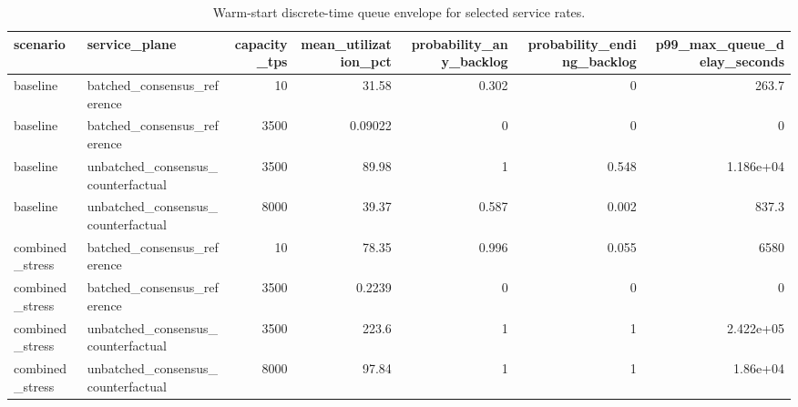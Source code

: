 \begin{table}[t]
\centering
\small
\caption{Warm-start discrete-time queue envelope for selected service rates.}
\label{tab:queue-envelope}
\begin{tabular}{llrrrrr}
\toprule
scenario & service\_plane & capacity\_tps & mean\_utilization\_pct & probability\_any\_backlog & probability\_ending\_backlog & p99\_max\_queue\_delay\_seconds \\
\midrule
baseline & batched\_consensus\_reference & 10 & 31.58 & 0.302 & 0 & 263.7 \\
baseline & batched\_consensus\_reference & 3500 & 0.09022 & 0 & 0 & 0 \\
baseline & unbatched\_consensus\_counterfactual & 3500 & 89.98 & 1 & 0.548 & 1.186e+04 \\
baseline & unbatched\_consensus\_counterfactual & 8000 & 39.37 & 0.587 & 0.002 & 837.3 \\
combined\_stress & batched\_consensus\_reference & 10 & 78.35 & 0.996 & 0.055 & 6580 \\
combined\_stress & batched\_consensus\_reference & 3500 & 0.2239 & 0 & 0 & 0 \\
combined\_stress & unbatched\_consensus\_counterfactual & 3500 & 223.6 & 1 & 1 & 2.422e+05 \\
combined\_stress & unbatched\_consensus\_counterfactual & 8000 & 97.84 & 1 & 1 & 1.86e+04 \\
\bottomrule
\end{tabular}
\end{table}
